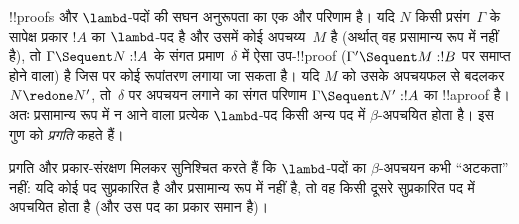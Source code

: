 \documentclass[../../../include/open-logic-section]{subfiles}
\begin{document}
!!{proof}s और $\lambd$-पदों की सघन अनुरूपता का एक और परिणाम है। यदि $N$ किसी
प्रसंग~$\Gamma$ के सापेक्ष प्रकार $!A$ का $\lambd$-पद है और उसमें कोई
अपचय्य~$M$ है (अर्थात् वह प्रसामान्य रूप में नहीं है), तो $\Gamma \Sequent N
: !A$ के संगत  प्रमाण~$\delta$ में ऐसा उप-!!{proof} ($\Gamma'
\Sequent M: !B$ पर समाप्त होने वाला) है जिस पर कोई रूपांतरण लगाया जा सकता है।
यदि $M$ को उसके अपचयफल से बदलकर $N \redone N'$, तो~$\delta$ पर अपचयन लगाने का
संगत परिणाम $\Gamma \Sequent N' : !A$ का !!a{proof} है। अतः प्रसामान्य रूप में
न आने वाला प्रत्येक $\lambd$-पद किसी अन्य पद में $\beta$-अपचयित होता है। इस
गुण को \emph{प्रगति} कहते हैं।

प्रगति और प्रकार-संरक्षण मिलकर सुनिश्चित करते हैं कि $\lambd$-पदों का
$\beta$-अपचयन कभी ``अटकता'' नहीं: यदि कोई पद सुप्रकारित है और प्रसामान्य रूप
में नहीं है, तो वह किसी दूसरे सुप्रकारित पद में अपचयित होता है (और उस पद का
प्रकार समान है)।
\end{document}
